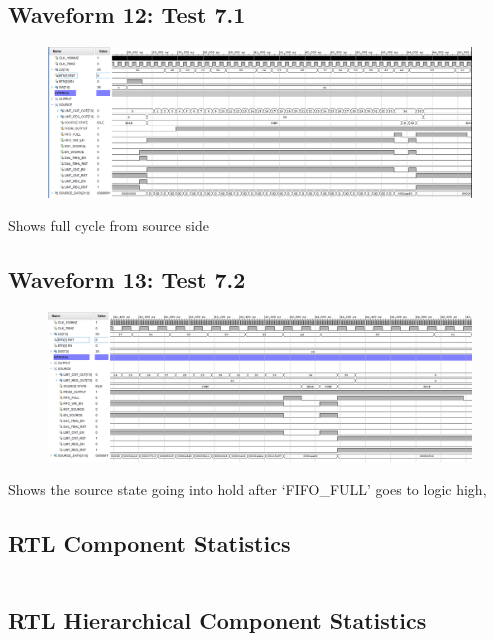 \documentclass[11pt]{report}
\begin{document}
\subsection*{Waveform 12: Test 7.1 }
\begin{figure}[H]
       \includegraphics[width=\columnwidth]{Assets/Test7_1.png}
\end{figure}

Shows full cycle from source side\\

\subsection*{Waveform 13: Test 7.2 }
\begin{figure}[H]
       \includegraphics[width=\columnwidth]{Assets/Test7_2.png}
\end{figure}

Shows the source state going into hold after `FIFO\_FULL' goes to logic high,

\subsection*{RTL Component Statistics}
\inputminted[firstline=165,lastline=190]{text}{../../../DE_Project_T2/DE_Project_T2.runs/synth_1/TOP_LEVEL.vds}

\newpage

\subsection*{RTL Hierarchical Component Statistics}
\inputminted[firstline=193,lastline=264]{text}{../../../DE_Project_T2/DE_Project_T2.runs/synth_1/TOP_LEVEL.vds}
\end{document}
